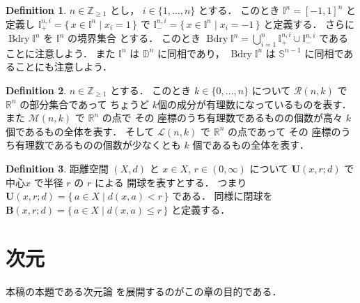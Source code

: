 \documentclass[leqno, a4paper, 12pt]{jsarticle}
\theoremstyle{plain}
\theoremstyle{definition}
\newtheorem{df}{Definition}[section]
\theoremstyle{remark}
\newcommand{\zz}{\mathbb{Z}}
\newcommand{\rr}{\mathbb{R}}
\DeclareMathOperator{\bd}{\mathrm{Bdry}}
\newcommand{\yospfont}[1]{\mathbb{#1}}
\newcommand{\yodisc}[1]{\yospfont{D}^{#1}}
\newcommand{\yosphere}[1]{\yospfont{S}^{#1}}
\newcommand{\yocube}[1]{\yospfont{I}^{#1}}
\newcommand{\yocubesidep}[2]{\yospfont{I}^{#1, #2}_{+}}
\newcommand{\yocubesidem}[2]{\yospfont{I}^{#1, #2}_{-}}
\newcommand{\yocubebd}[1]{\bd\yospfont{I}^{#1}}
\newcommand{\yospspfont}{\mathscr}
\newcommand{\yorrsp}[2]{\yospspfont{R}({#1}, {#2})}
\newcommand{\yommsp}[2]{\yospspfont{M}({#1}, {#2})}
\newcommand{\yollsp}[2]{\yospspfont{L}({#1}, {#2})}
\newcommand{\yoballfont}{\mathbf}
\newcommand{\yometoball}[3]{\yoballfont{U}(#1, #2; #3)}
\newcommand{\yometcball}[3]{\yoballfont{B}(#1, #2; #3)}
\numberwithin{equation}{section}
\begin{document}
\begin{df}
$n\in \zz_{\ge 1}$
とし，
$i\in \{1, \dots, n\}$
とする．
このとき
$\yocube{n}=[-1, 1]^{n}$
と定義し
$\yocubesidep{n}{i}=\{\, x\in \yocube{n}\mid x_{i}=1\, \}$
で
$\yocubesidem{n}{i}=\{\, x\in \yocube{n}\mid x_{i}=-1\, \}$
と定義する．
さらに
$\yocubebd{n}$
を
$\yocube{n}$
の境界集合
とする．
このとき
$\yocubebd{n}=\bigcup_{i=1}^{n}\yocubesidep{n}{i}\cup \yocubesidem{n}{i}$
であることに注意しよう．
また
$\yocube{n}$
は
$\yodisc{n}$
に同相であり，
$\yocubebd{n}$
は
$\yosphere{n-1}$
に同相であることにも注意しよう．
\end{df}

\begin{df}
$n\in \zz_{\ge 1}$
とする．
このとき
$k\in \{0, \dots, n\}$
について
$\yorrsp{n}{k}$
で
$\rr^{n}$
の部分集合であって
ちょうど
$k$個の成分が有理数になっているものを表す．
また
$\yommsp{n}{k}$
で
$\rr^{n}$
の点で
その
座標のうち有理数であるものの個数が高々
$k$個であるもの全体を表す．
そして
$\yollsp{n}{k}$
で
$\rr^{n}$
の点であって
その
座標のうち有理数であるものの個数が少なくとも
$k$
個であるもの全体を表す．
\end{df}


\begin{df}
距離空間
$(X, d)$
と
$x\in X$, 
$r\in (0, \infty)$
について
$\yometoball{x}{r}{d}$
で
中心$x$
で半径
$r$
の
$r$
による
開球を表すとする．
つまり
$\yometoball{x}{r}{d}=\{\, a\in X\mid d(x, a)<r\, \}$
である．
同様に閉球を
$\yometcball{x}{r}{d}=\{\, a\in X\mid d(x, a)\le r\, \}$
と定義する．
\end{df}





\section{次元}\label{sec:dimensions}
本稿の本題である次元論
を展開するのがこの章の目的である．
\end{document}
